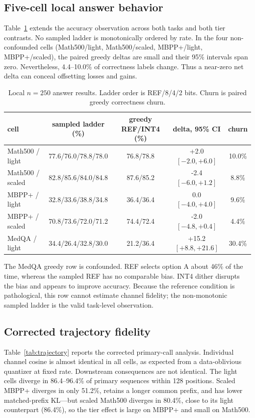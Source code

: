 \documentclass{article}
\begin{document}
\subsection{Five-cell local answer behavior}
\label{sec:answer}

Table~\ref{tab:local-answer} extends the accuracy observation across both tasks and
both tier contrasts. No sampled ladder is monotonically ordered by rate. In the four
non-confounded cells (Math500/light, Math500/scaled, MBPP+/light, MBPP+/scaled), the
paired greedy deltas are small and their 95\% intervals span zero. Nevertheless,
4.4--10.0\% of correctness labels change. Thus a near-zero net delta can conceal
offsetting losses and gains.

\begin{table}[t]
\centering
\small
\caption{Local $n=250$ answer results. Ladder order is REF/8/4/2 bits. Churn is
paired greedy correctness churn.}
\label{tab:local-answer}
\begin{tabular}{lcccc}
\toprule
cell & sampled ladder (\%) & greedy REF/INT4 (\%) & delta, 95\% CI & churn \\
\midrule
Math500 / light & 77.6/76.0/78.8/78.0 & 76.8/78.8 & +2.0 $[-2.0,+6.0]$ & 10.0\% \\
Math500 / scaled & 82.8/85.6/84.0/84.8 & 87.6/85.2 & -2.4 $[-6.0,+1.2]$ & 8.8\% \\
MBPP+ / light & 32.8/33.6/38.8/34.8 & 36.4/36.4 & 0.0 $[-4.0,+4.0]$ & 9.6\% \\
MBPP+ / scaled & 70.8/73.6/72.0/71.2 & 74.4/72.4 & -2.0 $[-4.8,+0.4]$ & 4.4\% \\
MedQA / light & 34.4/26.4/32.8/30.0 & 21.2/36.4 & +15.2 $[+8.8,+21.6]$ & 30.4\% \\
\bottomrule
\end{tabular}
\end{table}

The MedQA greedy row is confounded. REF selects option A about 46\% of the time,
whereas the sampled REF has no comparable bias. INT4 dither disrupts the bias and
appears to improve accuracy. Because the reference condition is pathological, this
row cannot estimate channel fidelity; the non-monotonic sampled ladder is the valid
task-level observation.

\subsection{Corrected trajectory fidelity}

Table~\ref{tab:trajectory} reports the corrected primary-call analysis. Individual
channel cosine is almost identical in all cells, as expected from a data-oblivious
quantizer at fixed rate. Downstream consequences are not identical. The light cells
diverge in 86.4--96.4\% of primary sequences within 128 positions. Scaled MBPP+
diverges in only 51.2\%, retains a longer common prefix, and has lower matched-prefix
KL---but scaled Math500 diverges in 80.4\%, close to its light counterpart (86.4\%),
so the tier effect is large on MBPP+ and small on Math500.
\end{document}
